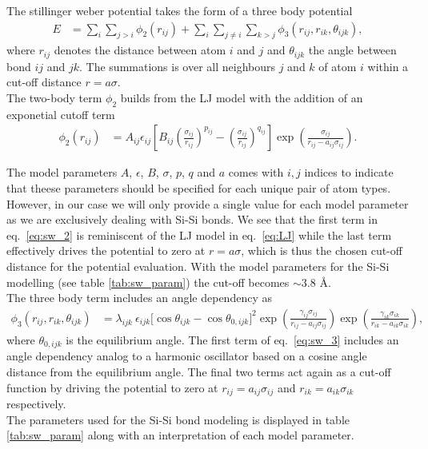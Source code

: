 The stillinger weber potential takes the form of a three body potential
\begin{align*}
  E &=\sum_i \sum_{j>i} \phi_2(r_{i j})+\sum_i \sum_{j \neq i} \sum_{k>j} \phi_3(r_{ij}, r_{ik}, \theta_{ijk}),
\end{align*}
where $r_{ij}$ denotes the distance between atom $i$ and $j$ and $\theta_{ijk}$ the angle between bond $ij$ and $jk$. The summations is over all neighbours $j$ and $k$ of atom $i$ within a cut-off distance $r = a\sigma$. \\
The two-body term $\phi_2$ builds from the LJ model with the addition of an exponetial cutoff term
\begin{align}
  \phi_2(r_{i j}) & =A_{ij} \epsilon_{ij}\left[B_{ij}\left(\frac{\sigma_{ij}}{r_{ij}}\right)^{p_{ij}} - \left(\frac{\sigma_{ij}}{r_{ij}}\right)^{q_{ij}}\right] \exp (\frac{\sigma_{ij}}{r_{ij}-a_{ij} \sigma_{ij}}).
  \label{eq:sw_2}
\end{align}

The model parameters $A$, $\epsilon$, $B$, $\sigma$, $p$, $q$ and $a$ comes with $i,j$ indices to indicate that theese parameters should be specified for each unique pair of atom types. However, in our case we will only provide a single value for each model parameter as we are exclusively dealing with Si-Si bonds. We see that the first term in eq.~\eqref{eq:sw_2} is reminiscent of the LJ model in eq.~\eqref{eq:LJ} while the last term effectively drives the potential to zero at $r=a\sigma$, which is thus the chosen cut-off distance for the potential evaluation. With the model parameters for the Si-Si modelling (see table \ref{tab:sw_param}) the cut-off becomes $\sim 3.8$ Å. \\
The three body term includes an angle dependency as
\begin{align}
  \phi_3(r_{ij}, r_{ik}, \theta_{ijk}) &= \lambda_{ijk} \ \epsilon_{ijk} \Big[\cos \theta_{ijk}-\cos \theta_{0,ijk}\Big]^2 \exp (\frac{\gamma_{ij} \sigma_{ij}}{r_{ij} - a_{ij} \sigma_{ij}}) \exp (\frac{\gamma_{ik} \sigma_{ik}}{r_{ik} - a_{ik} \sigma_{ik}}),
  \label{eq:sw_3}
\end{align}
where $\theta_{0,ijk}$ is the equilibrium angle. The first term of eq.~\eqref{eq:sw_3} includes an angle dependency analog to a harmonic oscillator based on a cosine angle distance from the equilibrium angle. The final two terms act again as a cut-off function by driving the potential to zero at $r_{ij} = a_{ij}\sigma_{ij}$ and $r_{ik} = a_{ik}\sigma_{ik}$ respectively. \\ 
The parameters used for the Si-Si bond modeling is displayed in table \ref{tab:sw_param} along with an interpretation of each model parameter.



